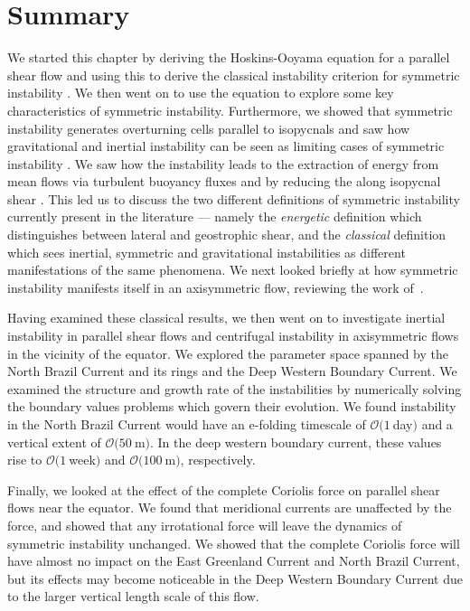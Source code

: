 \section{Summary}
We started this chapter by deriving the Hoskins-Ooyama equation for a parallel shear flow and using this to derive the classical instability criterion for symmetric instability \citep{Hoskins1974, Ooyama1966, Stone1966}. We then went on to use the equation to explore some key characteristics of symmetric instability. Furthermore, we showed that symmetric instability generates overturning cells parallel to isopycnals and saw how gravitational and inertial instability can be seen as limiting cases of symmetric instability \citep{Xu1985, emanuelSlantwiseConvection1994}. We saw how the instability leads to the extraction of energy from mean flows via turbulent buoyancy fluxes and by reducing the along isopycnal shear \citep{Haine1998, Thomas2013}. This led us to discuss the two different definitions of symmetric instability currently present in the literature --- namely the \textit{energetic} definition which distinguishes between lateral and geostrophic shear, and the \textit{classical} definition which sees inertial, symmetric and gravitational instabilities as different manifestations of the same phenomena. We next looked briefly at how symmetric instability manifests itself in an axisymmetric flow, reviewing the work of~\citet{Buckingham2021}.

Having examined these classical results, we then went on to investigate inertial instability in parallel shear flows and centrifugal instability in axisymmetric flows in the vicinity of the equator. We explored the parameter space spanned by the North Brazil Current and its rings and the Deep Western Boundary Current. We examined the structure and growth rate of the instabilities by numerically solving the boundary values problems which govern their evolution. We found instability in the North Brazil Current would have an e-folding timescale of $\mathcal{O}(1~$day$)$ and a vertical extent of $\mathcal{O}(50~$m$)$. In the deep western boundary current, these values rise to $\mathcal{O}(1~$week$)$ and $\mathcal{O}(100~$m$)$, respectively.

Finally, we looked at the effect of the complete Coriolis force on parallel shear flows near the equator. We found that meridional currents are unaffected by the force, and showed that any irrotational force will leave the dynamics of symmetric instability unchanged. We showed that the complete Coriolis force will have almost no impact on the East Greenland Current and North Brazil Current, but its effects may become noticeable in the Deep Western Boundary Current due to the larger vertical length scale of this flow.

